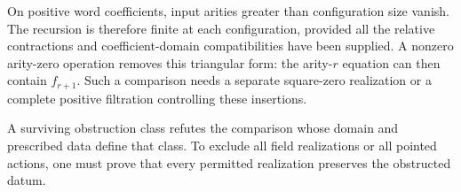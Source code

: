 On positive word coefficients, input arities greater than
configuration size vanish.  The recursion is therefore finite
at each configuration, provided all the relative contractions
and coefficient-domain compatibilities have been supplied.
A nonzero arity-zero operation removes this triangular form:
the arity-\(r\) equation can then contain \(f_{r+1}\).
Such a comparison needs a separate square-zero realization or
a complete positive filtration controlling these insertions.

A surviving obstruction class refutes the comparison whose
domain and prescribed data define that class.  To exclude all
field realizations or all pointed actions, one must prove that
every permitted realization preserves the obstructed datum.
